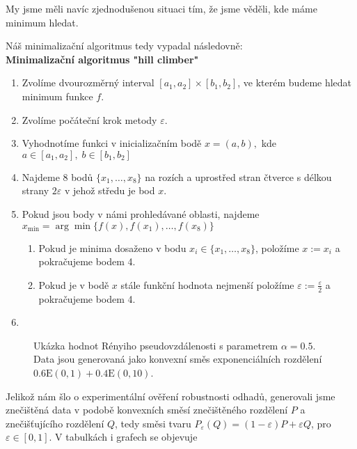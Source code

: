 My jsme měli navíc zjednodušenou situaci tím, že jsme věděli, kde máme minimum hledat. 

Náš minimalizační algoritmus tedy vypadal následovně:
\vspace{11 pt}
\\
\textbf{Minimalizační algoritmus "hill climber"}

\begin{enumerate}
	\item Zvolíme dvourozměrný interval $[a_1,a_2]\times [b_1,b_2]$, ve kterém budeme hledat minimum funkce $f$.
	\item Zvolíme počáteční krok metody $\varepsilon$.
	\item Vyhodnotíme funkci v inicializačním bodě $x = (a,b),$ kde $a \in [a_1,a_2],\; b \in [b_1,b_2]$	
	\item Najdeme 8 bodů $\lbrace x_1,\ldots,x_8 \rbrace$ na rozích a uprostřed stran čtverce s délkou strany $2\varepsilon$ v jehož středu je bod $x$.	
	\item Pokud jsou body v námi prohledávané oblasti, najdeme $x_{\min} = \arg\min \lbrace f(x),f(x_1),\ldots,f(x_8)\rbrace$
		\begin{enumerate}
			\item Pokud je minima dosaženo v bodu $x_i \in \lbrace x_1,\ldots,x_8 \rbrace$, položíme $x := x_i$ a pokračujeme bodem 4.
			\item Pokud je v bodě $x$ stále funkční hodnota nejmenší položíme $\varepsilon:= \frac{\varepsilon}{2}$ a pokračujeme bodem 4.
		\end{enumerate}		
	\item 
	
	
\end{enumerate}

\begin{figure}[htb!]
	\begin{center}
		\caption{Ukázka hodnot Rényiho pseudovzdálenosti s parametrem $\alpha = 0.5$. Data jsou generovaná jako konvexní směs exponenciálních rozdělení $0.6\mathrm{E}(0,1) + 0.4 \mathrm{E}(0,10)$.}
		\label{fig-distanceE}
	\end{center}
\end{figure}





Jelikož nám šlo o experimentální ověření robustnosti odhadů, generovali jsme znečištěná data v podobě konvexních směsí znečištěného rozdělení $P$ a znečišťujícího rozdělení $Q$, tedy směsi tvaru $P_\varepsilon(Q) = (1-\varepsilon)P + \varepsilon Q$, pro $\varepsilon \in [0,1]$. V tabulkách i grafech se objevuje 

